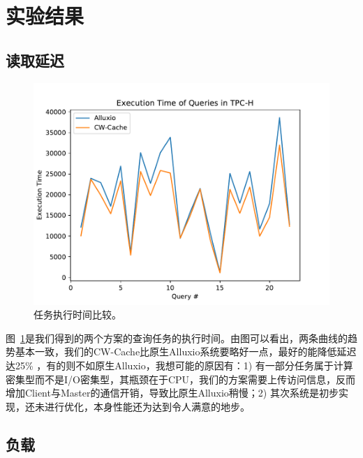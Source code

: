 \section{实验结果}

\subsection{读取延迟}

\begin{figure}[ht]
	\centering
	\includegraphics[width=0.70\paperwidth]{img/evaluation/query-execution-time}
	\caption{任务执行时间比较。}
	\label{fig:q-exe}
\end{figure}

\par 图~\ref{fig:q-exe}是我们得到的两个方案的查询任务的执行时间。由图可以看出，两条曲线的趋势基本一致，我们的CW-Cache比原生Alluxio系统要略好一点，最好的能降低延迟达25\% ，有的则不如原生Alluxio，我想可能的原因有：1) 有一部分任务属于计算密集型而不是I/O密集型，其瓶颈在于CPU，我们的方案需要上传访问信息，反而增加Client与Master的通信开销，导致比原生Alluxio稍慢；2) 其次系统是初步实现，还未进行优化，本身性能还为达到令人满意的地步。

\subsection{负载}

